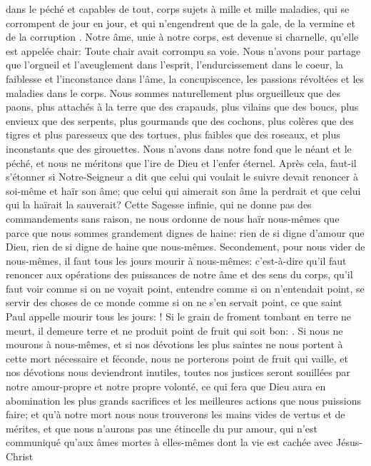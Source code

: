 dans le péché et capables de tout, corps sujets à mille et mille maladies, qui se corrompent de jour en jour, et qui
n'engendrent que de la gale, de la vermine et de la corruption .
Notre âme, unie à notre corps, est devenue si charnelle, qu'elle est appelée chair: Toute chair avait corrompu sa
voie. Nous n'avons pour partage que l'orgueil et l'aveuglement dans l'esprit, l'endurcissement dans le coeur, la
faiblesse et l'inconstance dans l'âme, la concupiscence, les passions révoltées et les maladies dans le corps. Nous
sommes naturellement plus orgueilleux que des paons, plus attachés à la terre que des crapauds, plus vilains que
des boucs, plus envieux que des serpents, plus gourmands que des cochons, plus colères que des tigres et plus
paresseux que des tortues, plus faibles que des roseaux, et plus inconstants que des girouettes. Nous n'avons
dans notre fond que le néant et le péché, et nous ne méritons que l'ire de Dieu et l'enfer éternel.
 Après cela, faut-il s'étonner si Notre-Seigneur a dit que celui qui voulait le suivre devait renoncer à soi-même
et haïr son âme; que celui qui aimerait son âme la perdrait et que celui qui la haïrait la sauverait? Cette Sagesse
infinie, qui ne donne pas des commandements sans raison, ne nous ordonne de nous haïr nous-mêmes que parce
que nous sommes grandement dignes de haine: rien de si digne d'amour que Dieu, rien de si digne de haine que
nous-mêmes.
 Secondement, pour nous vider de nous-mêmes, il faut tous les jours mourir à nous-mêmes: c'est-à-dire qu'il
faut renoncer aux opérations des puissances de notre âme et des sens du corps, qu'il faut voir comme si on ne
voyait point, entendre comme si on n'entendait point, se servir des choses de ce monde comme si on ne s'en
servait point, ce que saint Paul appelle mourir tous les jours: ! Si le grain de froment tombant en
terre ne meurt, il demeure terre et ne produit point de fruit qui soit bon: . Si nous ne mourons à nous-mêmes, et si nos dévotions les plus saintes ne
nous portent à cette mort nécessaire et féconde, nous ne porterons point de fruit qui vaille, et nos dévotions nous
deviendront inutiles, toutes nos justices seront souillées par notre amour-propre et notre propre volonté, ce qui fera
que Dieu aura en abomination les plus grands sacrifices et les meilleures actions que nous puissions faire; et qu'à
notre mort nous nous trouverons les mains vides de vertus et de mérites, et que nous n'aurons pas une étincelle
du pur amour, qui n'est communiqué qu'aux âmes mortes à elles-mêmes dont la vie est cachée avec Jésus-Christ
